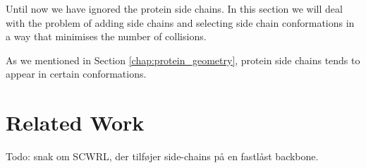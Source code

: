 Until now we have ignored the protein side chains. In this section we
will deal with the problem of adding side chains and selecting side
chain conformations in a way that minimises the number of collisions.

As we mentioned in Section \ref{chap:protein_geometry}, protein side
chains tends to appear in certain conformations. 

\section{Related Work}
Todo: snak om SCWRL, der tilføjer side-chains på en fastlåst backbone.


